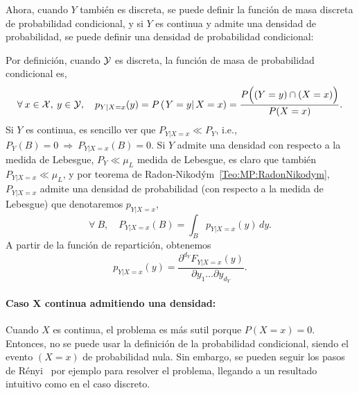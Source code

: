 Ahora, cuando $Y$  tambi\'en es discreta, se puede definir  la funci\'on de masa
discreta de probabilidad condicional, y si $Y$ es continua y admite una densidad
de probabilidad, se puede definir una densidad de probabilidad condicional:
%
\begin{definicion}
\label{Def:MP:ReparticionCondicionalDiscreta}
%
  Por  definici\'on,  cuando  $\mathcal{Y}$  es   discreta,  la  funci\'on  de  masa  de
  probabilidad condicional  es,
  \[
  \forall \: x \in \mathcal{X}, \: y \in \mathcal{Y}, \quad p_{Y|X=x}(y) = P\left( \left. Y = y \right|
  X  =  x \right)  =  \frac{P\Big(  (Y  = y)  \cap  (X =  x) \Big)}{P(X = x)}.
  \]
  Si $Y$ es continua, es sencillo ver que $P_{Y|X=x} \ll P_Y$, i.e., $P_Y(B) = 0
  \: \Rightarrow \: P_{Y|X=x}(B) = 0$.   Si $Y$ admite una densidad con respecto
  a la  medida de  Lebesgue, $P_Y \ll  \mu_L$ medida  de Lebesgue, es  claro que
  tambi\'en     $P_{Y|X=x}     \ll      \mu_L$,     y     por     teorema     de
  Radon-Nikod\'ym~\ref{Teo:MP:RadonNikodym}, $P_{Y|X=x}$  admite una densidad de
  probabilidad  (con   respecto  a  la  medida  de   Lebesgue)  que  denotaremos
  $p_{Y|X=x}$,
  \[
  \forall \: B, \quad P_{Y|X=x}(B) = \int_B p_{Y|X=x}(y) \, dy.
  \]
  A partir de la funci\'on de repartici\'on, obtenemos
  \[
  p_{Y|X=x}(y) = \frac{\partial^{d_Y} F_{Y|X=x}(y)}{\partial y_1 \ldots \partial
    y_{d_Y}}.
  \]
\end{definicion}



\paragraph{Caso $\boldsymbol{X}$ continua admitiendo una densidad:}
Cuando  $X$  es   continua,  el  problema  es  m\'as   sutil  porque  $P(X=x)  =
0$. Entonces, no  se puede usar la definici\'on  de la probabilidad condicional,
siendo el  evento $(X=x)$ de probabilidad  nula.  Sin embargo,  se pueden seguir
los pasos  de R\'enyi~\cite[Cap.~5]{Ren} por ejemplo para  resolver el problema,
llegando a un resultado intuitivo como en el caso discreto.

